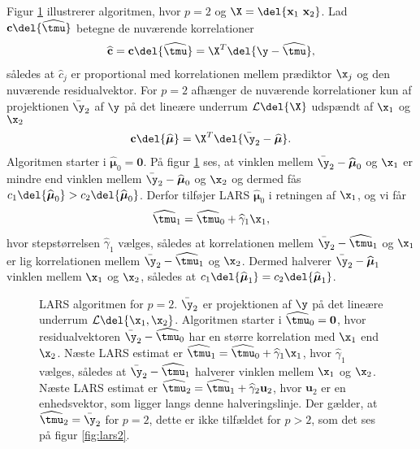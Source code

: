 Figur \ref{fig:lars} illustrerer algoritmen, hvor $p = 2$ og $\X = \del{\textbf{x}_1 \ \textbf{x}_2}$.
Lad \(\mathbf{c} \del{\widehat{\tmu}}\) betegne de nuværende korrelationer
\begin{align}
\widehat{\mathbf{c}} = \mathbf{c} \del{\widehat{\tmu}} = \X^T \del{\y - \widehat{\tmu}}, \label{eq:lars_1.6}
\end{align}
således at \(\widehat{c}_j\) er proportional med korrelationen mellem prædiktor \(\x_j\) og den nuværende residualvektor.
For \(p=2\) afhænger de nuværende korrelationer kun af projektionen \(\bar{\y}_2\) af \(\y\) på det lineære underrum $\mathcal{L} \del{\X}$ udspændt af \(\x_1\) og \(\x_2\)
\begin{align*}
\textbf{c}\del{\boldsymbol{\widehat{\mu}}} =  \X^T \del{ \bar{\y}_2 - \boldsymbol{\widehat{\mu}}}.
\end{align*}
Algoritmen starter i $\widehat{\boldsymbol{\mu}}_0 = \textbf{0}$.
På figur \ref{fig:lars} ses, at vinklen mellem \(\bar{\y}_2 - \widehat{\boldsymbol{\mu}}_0\) og \(\x_1\) er mindre end vinklen mellem \(\bar{\y}_2 - \widehat{\boldsymbol{\mu}}_0\) og \(\x_2\) og dermed fås \(c_1 \del{\widehat{\boldsymbol{\mu}}_0} > c_2 \del{\widehat{\boldsymbol{\mu}}_0}\).
Derfor tilføjer LARS \(\widehat{\boldsymbol{\mu}}_0\) i retningen af \(\x_1\), og vi får
\begin{align*}
\widehat{\tmu}_1 = \widehat{\tmu}_0 + \widehat{\gamma}_1 \x_1,
\end{align*}
hvor stepstørrelsen \(\widehat{\gamma}_1\) vælges, således at korrelationen mellem \(\bar{\y}_2 - \widehat{\tmu}_1\) og \(\x_1\) er lig korrelationen mellem \(\bar{\y}_2 - \widehat{\tmu}_1\) og \(\x_2\).
Dermed halverer \(\bar{\y}_2 - \widehat{\boldsymbol{\mu}}_1\) vinklen mellem \(\x_1\) og \(\x_2\), således at \(c_1 \del{\widehat{\boldsymbol{\mu}}_1} = c_2 \del{\widehat{\boldsymbol{\mu}}_1}\).
%
\begin{figure}[H]
\centering
\scalebox{0.8}{}
\caption{LARS algoritmen for \(p=2\). \(\bar{\y}_2\) er projektionen af \(\y\) på det lineære underrum \(\mathcal{L} \del{\x_1, \x_2}\).
Algoritmen starter i \(\widehat{\tmu}_0=\mathbf{0}\), hvor residualvektoren \(\bar{\y}_2 - \widehat{\tmu}_0\) har en større korrelation med \(\x_1\) end \(\x_2\). Næste LARS estimat er \(\widehat{\tmu}_1 = \widehat{\tmu}_0 + \widehat{\gamma}_1 \x_1\), hvor \(\widehat{\gamma}_1\) vælges, således at \(\bar{\y}_2 - \widehat{\tmu}_1\) halverer vinklen mellem \(\x_1\) og \(\x_2\). Næste LARS estimat er \(\widehat{\tmu}_2 = \widehat{\tmu}_1 + \widehat{\gamma}_2 \mathbf{u}_2\), hvor \(\mathbf{u}_2\) er en enhedsvektor, som ligger langs denne halveringslinje.
Der gælder, at \(\widehat{\tmu}_2 = \bar{\y}_2\) for \(p=2\), dette er ikke tilfældet for \(p>2\), som det ses på figur \ref{fig:lars2}.
 }\label{fig:lars}
\end{figure}
